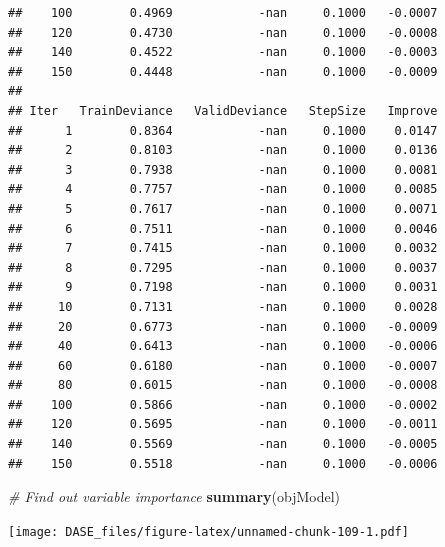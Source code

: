\documentclass[]{book}
\newenvironment{Shaded}{\begin{snugshade}}{\end{snugshade}}
\newcommand{\KeywordTok}[1]{\textcolor[rgb]{0.13,0.29,0.53}{\textbf{{#1}}}}
\newcommand{\CommentTok}[1]{\textcolor[rgb]{0.56,0.35,0.01}{\textit{{#1}}}}
\newcommand{\NormalTok}[1]{{#1}}
\begin{document}
\begin{verbatim}
##    100        0.4969            -nan     0.1000   -0.0007
##    120        0.4730            -nan     0.1000   -0.0008
##    140        0.4522            -nan     0.1000   -0.0003
##    150        0.4448            -nan     0.1000   -0.0009
## 
## Iter   TrainDeviance   ValidDeviance   StepSize   Improve
##      1        0.8364            -nan     0.1000    0.0147
##      2        0.8103            -nan     0.1000    0.0136
##      3        0.7938            -nan     0.1000    0.0081
##      4        0.7757            -nan     0.1000    0.0085
##      5        0.7617            -nan     0.1000    0.0071
##      6        0.7511            -nan     0.1000    0.0046
##      7        0.7415            -nan     0.1000    0.0032
##      8        0.7295            -nan     0.1000    0.0037
##      9        0.7198            -nan     0.1000    0.0031
##     10        0.7131            -nan     0.1000    0.0028
##     20        0.6773            -nan     0.1000   -0.0009
##     40        0.6413            -nan     0.1000   -0.0006
##     60        0.6180            -nan     0.1000   -0.0007
##     80        0.6015            -nan     0.1000   -0.0008
##    100        0.5866            -nan     0.1000   -0.0002
##    120        0.5695            -nan     0.1000   -0.0011
##    140        0.5569            -nan     0.1000   -0.0005
##    150        0.5518            -nan     0.1000   -0.0006
\end{verbatim}

\begin{Shaded}
\begin{Highlighting}[]
\CommentTok{# Find out variable importance}
\KeywordTok{summary}\NormalTok{(objModel)}
\end{Highlighting}
\end{Shaded}

\texttt{[image: DASE\_files/figure-latex/unnamed-chunk-109-1.pdf]}
\end{document}
